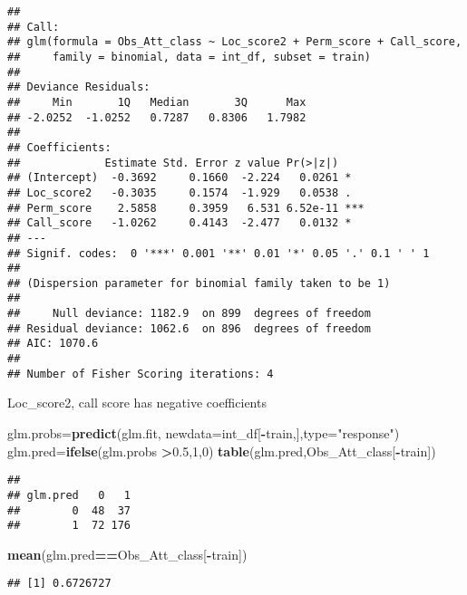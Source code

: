 \documentclass[]{article}
\newenvironment{Shaded}{\begin{snugshade}}{\end{snugshade}}
\newcommand{\KeywordTok}[1]{\textcolor[rgb]{0.13,0.29,0.53}{\textbf{#1}}}
\newcommand{\DataTypeTok}[1]{\textcolor[rgb]{0.13,0.29,0.53}{#1}}
\newcommand{\DecValTok}[1]{\textcolor[rgb]{0.00,0.00,0.81}{#1}}
\newcommand{\FloatTok}[1]{\textcolor[rgb]{0.00,0.00,0.81}{#1}}
\newcommand{\StringTok}[1]{\textcolor[rgb]{0.31,0.60,0.02}{#1}}
\newcommand{\OperatorTok}[1]{\textcolor[rgb]{0.81,0.36,0.00}{\textbf{#1}}}
\newcommand{\NormalTok}[1]{#1}
\begin{document}
\begin{verbatim}
## 
## Call:
## glm(formula = Obs_Att_class ~ Loc_score2 + Perm_score + Call_score, 
##     family = binomial, data = int_df, subset = train)
## 
## Deviance Residuals: 
##     Min       1Q   Median       3Q      Max  
## -2.0252  -1.0252   0.7287   0.8306   1.7982  
## 
## Coefficients:
##             Estimate Std. Error z value Pr(>|z|)    
## (Intercept)  -0.3692     0.1660  -2.224   0.0261 *  
## Loc_score2   -0.3035     0.1574  -1.929   0.0538 .  
## Perm_score    2.5858     0.3959   6.531 6.52e-11 ***
## Call_score   -1.0262     0.4143  -2.477   0.0132 *  
## ---
## Signif. codes:  0 '***' 0.001 '**' 0.01 '*' 0.05 '.' 0.1 ' ' 1
## 
## (Dispersion parameter for binomial family taken to be 1)
## 
##     Null deviance: 1182.9  on 899  degrees of freedom
## Residual deviance: 1062.6  on 896  degrees of freedom
## AIC: 1070.6
## 
## Number of Fisher Scoring iterations: 4
\end{verbatim}

Loc\_score2, call score has negative coefficients

\begin{Shaded}
\begin{Highlighting}[]
\NormalTok{glm.probs=}\KeywordTok{predict}\NormalTok{(glm.fit, }\DataTypeTok{newdata=}\NormalTok{int_df[}\OperatorTok{-}\NormalTok{train,],}\DataTypeTok{type=}\StringTok{"response"}\NormalTok{) }
\NormalTok{glm.pred=}\KeywordTok{ifelse}\NormalTok{(glm.probs }\OperatorTok{>}\FloatTok{0.5}\NormalTok{,}\DecValTok{1}\NormalTok{,}\DecValTok{0}\NormalTok{)}
\KeywordTok{table}\NormalTok{(glm.pred,Obs_Att_class[}\OperatorTok{-}\NormalTok{train])}
\end{Highlighting}
\end{Shaded}

\begin{verbatim}
##         
## glm.pred   0   1
##        0  48  37
##        1  72 176
\end{verbatim}

\begin{Shaded}
\begin{Highlighting}[]
\KeywordTok{mean}\NormalTok{(glm.pred}\OperatorTok{==}\NormalTok{Obs_Att_class[}\OperatorTok{-}\NormalTok{train])}
\end{Highlighting}
\end{Shaded}

\begin{verbatim}
## [1] 0.6726727
\end{verbatim}
\end{document}
